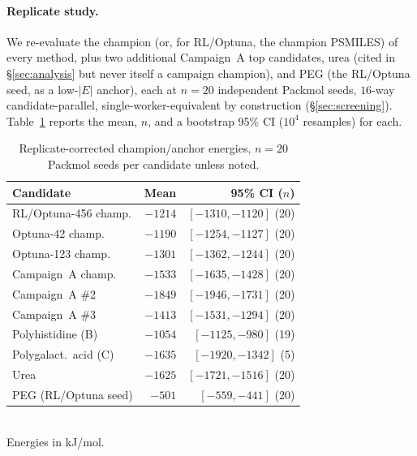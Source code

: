 \documentclass[twocolumn]{fairmeta}
\begin{document}
\paragraph{Replicate study.}
We re-evaluate the champion (or, for RL/Optuna, the champion PSMILES) of every method, plus two additional Campaign~A top candidates, urea (cited in \S\ref{sec:analysis} but never itself a campaign champion), and PEG (the RL/Optuna seed, as a low-$|E|$ anchor), each at $n{=}20$ independent Packmol seeds, $16$-way candidate-parallel, single-worker-equivalent by construction (\S\ref{sec:screening}).
Table~\ref{tab:replicates} reports the mean, $n$, and a bootstrap 95\% CI ($10^4$ resamples) for each.

\begin{table}[t]
\centering
\caption{Replicate-corrected champion/anchor energies, $n{=}20$ Packmol seeds per candidate unless noted.}
\label{tab:replicates}
\scriptsize
\begin{tabular}{@{}lrr@{}}
\toprule
\textbf{Candidate} & \textbf{Mean} & \textbf{95\% CI ($n$)} \\
\midrule
RL/Optuna-456 champ. & $-1214$ & $[-1310,-1120]$ (20) \\
Optuna-42 champ.      & $-1190$ & $[-1254,-1127]$ (20) \\
Optuna-123 champ.     & $-1301$ & $[-1362,-1244]$ (20) \\
Campaign~A champ.     & $-1533$ & $[-1635,-1428]$ (20) \\
Campaign~A \#2        & $-1849$ & $[-1946,-1731]$ (20) \\
Campaign~A \#3        & $-1413$ & $[-1531,-1294]$ (20) \\
Polyhistidine (B)     & $-1054$ & $[-1125,-980]$ (19) \\
Polygalact.\ acid (C) & $-1635$ & $[-1920,-1342]$ (5)\footnotemark[3] \\
Urea                  & $-1625$ & $[-1721,-1516]$ (20) \\
PEG (RL/Optuna seed)  & $-501$  & $[-559,-441]$ (20) \\
\bottomrule
\end{tabular}
\\[2pt]
{\scriptsize Energies in kJ/mol.}
\end{table}
\end{document}
